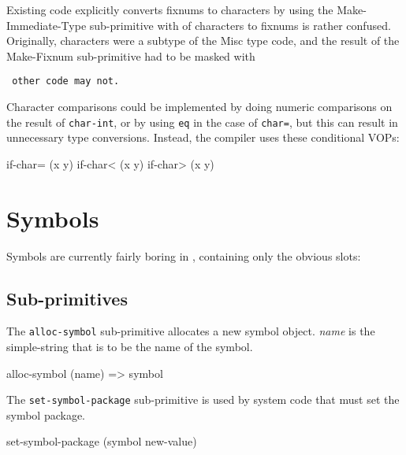Existing code explicitly converts fixnums to characters by using the
Make-Immediate-Type sub-primitive with %
of characters to fixnums is rather confused.  Originally, characters were a
subtype of the Misc type code, and the result of the Make-Fixnum sub-primitive
had to be masked with {\tt %
other code may not.

Character comparisons could be implemented by doing numeric comparisons on the
result of {\tt char-int}, or by using {\tt eq} in the case of {\tt char=}, but this
can result in unnecessary type conversions.  Instead, the compiler uses these
conditional VOPs:
\begin{example}
if-char= (x y)
if-char< (x y)
if-char> (x y)
\end{example}


\chapter{Symbols}


Symbols are currently fairly boring in \ccl, containing only the obvious slots:



\section{Sub-primitives}

The {\tt alloc-symbol} sub-primitive allocates a new symbol object.  {\it name} is
the simple-string that is to be the name of the symbol.
\begin{example}
alloc-symbol (name) => symbol
\end{example}

The {\tt set-symbol-package} sub-primitive is used by system code that must set
the symbol package.
\begin{example}
set-symbol-package (symbol new-value)
\end{example}


}
